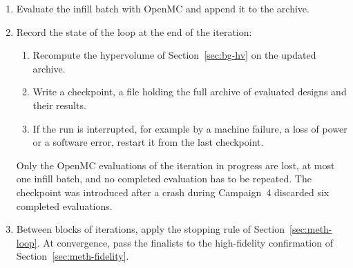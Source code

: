 \begin{enumerate}
        The candidate set and the uncertainty ranking play complementary
        roles:

        \begin{itemize}
          \item The candidate set supplies the \emph{exploitation}.
                Every candidate belongs to the rank-1 set of the surrogate
                search, so each is predicted to be among the best designs
                available.

          \item The uncertainty ranking supplies the
                \emph{exploration}. Among these promising designs, it
                sends to OpenMC those whose predictions are least
                supported by the data, so each evaluation tests a
                promising region and reduces the uncertainty where it is
                largest.
        \end{itemize}

  \item Evaluate the infill batch with OpenMC and append it to the
        archive.

  \item Record the state of the loop at the end of the iteration:
        \begin{enumerate}[label=\arabic{enumi}.\arabic*]
          \item Recompute the hypervolume of Section~\ref{sec:bg-hv} on
                the updated archive.

          \item Write a checkpoint, a file holding the full archive of
                evaluated designs and their results.

          \item If the run is interrupted, for example by a machine
                failure, a loss of power or a software error, restart it
                from the last checkpoint.
        \end{enumerate}

        Only the OpenMC evaluations of the iteration in progress are
        lost, at most one infill batch, and no completed evaluation has
        to be repeated. The checkpoint was introduced after a crash
        during Campaign~4 discarded six completed evaluations.

  \item Between blocks of iterations, apply the stopping rule of
        Section~\ref{sec:meth-loop}. At convergence, pass the finalists
        to the high-fidelity confirmation of
        Section~\ref{sec:meth-fidelity}.
\end{enumerate}


